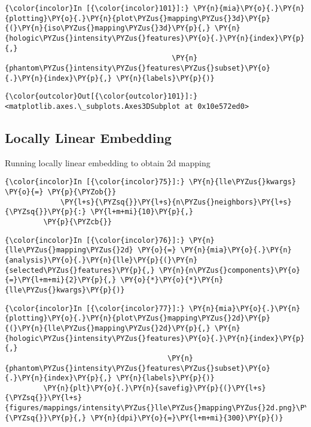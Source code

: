     \begin{Verbatim}[commandchars=\\\{\}]
{\color{incolor}In [{\color{incolor}101}]:} \PY{n}{mia}\PY{o}{.}\PY{n}{plotting}\PY{o}{.}\PY{n}{plot\PYZus{}mapping\PYZus{}3d}\PY{p}{(}\PY{n}{iso\PYZus{}mapping\PYZus{}3d}\PY{p}{,} \PY{n}{hologic\PYZus{}intensity\PYZus{}features}\PY{o}{.}\PY{n}{index}\PY{p}{,}
                                       \PY{n}{phantom\PYZus{}intensity\PYZus{}features\PYZus{}subset}\PY{o}{.}\PY{n}{index}\PY{p}{,} \PY{n}{labels}\PY{p}{)}
\end{Verbatim}

            \begin{Verbatim}[commandchars=\\\{\}]
{\color{outcolor}Out[{\color{outcolor}101}]:} <matplotlib.axes.\_subplots.Axes3DSubplot at 0x10e572ed0>
\end{Verbatim}

    \subsection{Locally Linear Embedding}\label{locally-linear-embedding}

Running locally linear embedding to obtain 2d mapping

    \begin{Verbatim}[commandchars=\\\{\}]
{\color{incolor}In [{\color{incolor}75}]:} \PY{n}{lle\PYZus{}kwargs} \PY{o}{=} \PY{p}{\PYZob{}}
             \PY{l+s}{\PYZsq{}}\PY{l+s}{n\PYZus{}neighbors}\PY{l+s}{\PYZsq{}}\PY{p}{:} \PY{l+m+mi}{10}\PY{p}{,}
         \PY{p}{\PYZcb{}}
\end{Verbatim}

    \begin{Verbatim}[commandchars=\\\{\}]
{\color{incolor}In [{\color{incolor}76}]:} \PY{n}{lle\PYZus{}mapping\PYZus{}2d} \PY{o}{=} \PY{n}{mia}\PY{o}{.}\PY{n}{analysis}\PY{o}{.}\PY{n}{lle}\PY{p}{(}\PY{n}{selected\PYZus{}features}\PY{p}{,} \PY{n}{n\PYZus{}components}\PY{o}{=}\PY{l+m+mi}{2}\PY{p}{,} \PY{o}{*}\PY{o}{*}\PY{n}{lle\PYZus{}kwargs}\PY{p}{)}
\end{Verbatim}

    \begin{Verbatim}[commandchars=\\\{\}]
{\color{incolor}In [{\color{incolor}77}]:} \PY{n}{mia}\PY{o}{.}\PY{n}{plotting}\PY{o}{.}\PY{n}{plot\PYZus{}mapping\PYZus{}2d}\PY{p}{(}\PY{n}{lle\PYZus{}mapping\PYZus{}2d}\PY{p}{,} \PY{n}{hologic\PYZus{}intensity\PYZus{}features}\PY{o}{.}\PY{n}{index}\PY{p}{,}
                                      \PY{n}{phantom\PYZus{}intensity\PYZus{}features\PYZus{}subset}\PY{o}{.}\PY{n}{index}\PY{p}{,} \PY{n}{labels}\PY{p}{)}
         \PY{n}{plt}\PY{o}{.}\PY{n}{savefig}\PY{p}{(}\PY{l+s}{\PYZsq{}}\PY{l+s}{figures/mappings/intensity\PYZus{}lle\PYZus{}mapping\PYZus{}2d.png}\PY{l+s}{\PYZsq{}}\PY{p}{,} \PY{n}{dpi}\PY{o}{=}\PY{l+m+mi}{300}\PY{p}{)}
\end{Verbatim}

